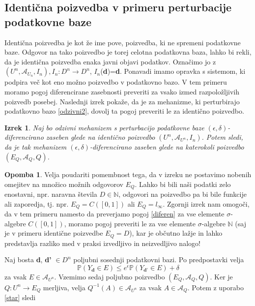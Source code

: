 \documentclass[12pt,a4paper]{amsart}
\theoremstyle{definition} %
\newtheorem{opomba}[definicija]{Opomba}
\theoremstyle{plain} %
\newtheorem{izrek}[definicija]{Izrek}
\begin{document}
\subsection{Identična poizvedba v primeru perturbacije podatkovne baze}
Identična poizvedba je kot že ime pove, poizvedba, ki ne spremeni podatkovne baze. Odgovor na tako poizvedbo je torej celotna podatkovna baza, lahko bi rekli, da je identična poizvedba enaka javni objavi podatkov. Označimo jo z $(U^n, \mathcal{A}_{U_n}, I_n), I_n : D^n \rightarrow D^n$, $I_n$(\textbf{d})=\textbf{d}. 
\newline
\newline
Ponavadi imamo opravka s sistemom, ki podpira več kot eno možno poizvedbo v podatkovno bazo. V tem primeru moramo pogoj diferencirane zasebnosti preveriti za vsako izmed razpoložljivih poizvedb posebej. Naslednji izrek pokaže, da je za mehanizme, ki perturbirajo podatkovno bazo \eqref{odzivni2}, dovolj ta pogoj preveriti le za identično poizvedbo.
\begin{izrek} 
Naj bo odzivni mehanizem s perturbacijo podatkovne baze  $(\epsilon , \delta)$-diferencirano zaseben glede na identično poizvedbo $(U^n, \mathcal{A}_{U^n}, I_n)$. Potem sledi, da je tak mehanizem $(\epsilon , \delta)$-diferencirano zaseben glede na katerokoli poizvedbo $(E_Q, \mathcal{A}_Q, Q)$.
\end{izrek}
\begin{opomba} Velja poudariti pomembnost tega, da v izreku ne postavimo nobenih omejitev na množico možnih odgovorov $E_Q$.  Lahko bi bili naši podatki zelo enostavni, npr. naravna števila $D \in \mathbb{N}$, odgovori na poizvedbo pa bi bile funkcije ali zaporedja, tj. npr. $E_Q = C([0,1])$ ali $E_Q = l_\infty$. Zgornji izrek nam omogoči, da v tem primeru namesto da preverjamo pogoj \eqref{diferen} za vse elemente $\sigma$-algebre $C([0,1])$, moramo pogoj preveriti le za vse elemente $\sigma$-algebre $\mathbb{N}$ (saj je v primeru identične poizvedbe $E_Q=D$), kar je občutno lažje in lahko predstavlja razliko med v praksi izvedljivo in neizvedljivo nalogo!
\end{opomba}
\proof 
Naj bosta \textbf{d}, \textbf{d'} $\in D^n$ poljubni sosednji podatkovni bazi. Po predpostavki velja 
\begin{equation}\label{star}
\mathbb{P}(Y_{\textbf{d}} \in E) \leq e^\epsilon \mathbb{P}(Y_{\textbf{d'}} \in E) + \delta \tag {*}
\end{equation}
za vsak $E \in \mathcal{A}_{U^n}$. Vzemimo sedaj poljubno poizvedbo $(E_Q, \mathcal{A}_Q, Q)$. Ker je $Q: U^n \rightarrow E_Q$ merljiva, velja  $Q^{-1}(A)\in \mathcal{A}_{U^n}$ za vsak $A \in \mathcal{A}_Q$. Potem z uporabo \eqref{star} sledi 
\end{document}
